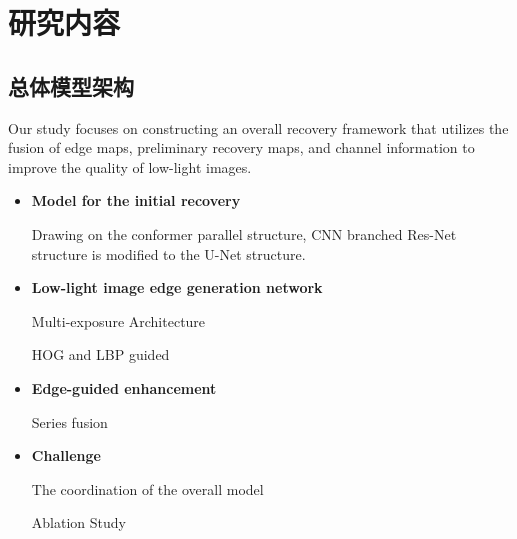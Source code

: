 \documentclass[CJK,aspectratio=169]{beamer}  %
\begin{document}
	\section{研究内容}
	
	\subsection{总体模型架构}
	
	\begin{frame}
		
		Our study focuses on constructing an overall recovery framework that utilizes the fusion of edge maps, preliminary recovery maps, and channel information to improve the quality of low-light images.
		
		
		\begin{itemize} 
			\item \textbf{Model for the initial recovery }
			
			\small Drawing on the conformer parallel structure, CNN branched Res-Net structure is modified to the U-Net structure.

			\item \textbf{Low-light image edge generation network}
			
			\small Multi-exposure Architecture
			
			\small HOG and LBP guided
			
			
			\item \textbf{Edge-guided enhancement}
			
			\small Series fusion
			
			\item \textbf{Challenge}
			
			\small The coordination of the overall model
			
			\small Ablation Study
			
			
		\end{itemize}
		
	\end{frame}
	
\end{document}
